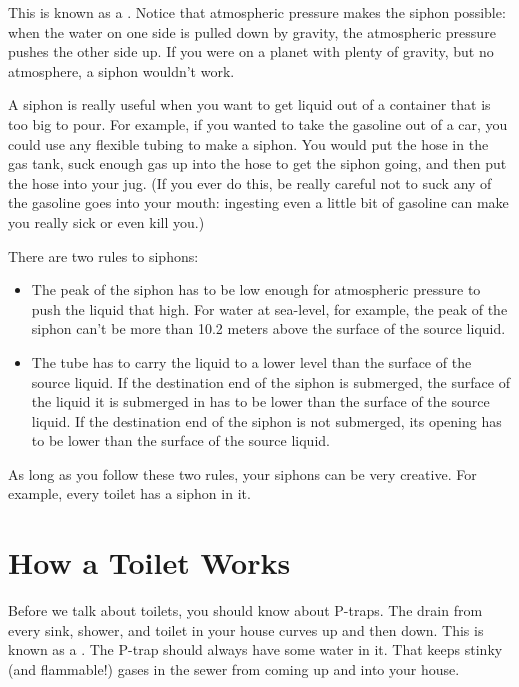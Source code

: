 This is known as a .   Notice that atmospheric pressure makes the siphon possible:  when the water on one side is pulled down by gravity,  the atmospheric pressure pushes the other side up.  If you were on a planet with plenty of gravity,  but no atmosphere,  a siphon wouldn't work.

A siphon is really useful when you want to get liquid out of a container that is too big to pour.   For 
example, if you wanted to take the gasoline out of a car,  you could use any flexible tubing to make a siphon.  You would put the hose in the gas tank,  suck enough gas up into the hose to get the siphon going,  and then put the hose into your jug.  (If you ever do this,  be really careful not to suck any of the gasoline goes into your mouth: ingesting even a little bit of gasoline can make you really sick or even kill you.)

There are two rules to siphons:
\begin{itemize}
\item The peak of the siphon has to be low enough for atmospheric pressure to push the liquid that high.  For water at sea-level, for example,  the peak of the siphon can't be more than 10.2 meters above the surface of the source liquid. 

\item  The tube has to carry the liquid to a lower level than the surface of the source liquid.   If the destination end of the siphon is submerged,  the surface of the liquid it is submerged in has to be lower than the surface of the source liquid.  If the destination end of the siphon is not submerged,  its opening has to be lower than the surface of the source liquid.
\end{itemize}

As long as you follow these two rules,  your siphons can be very creative.  For example,  every toilet has a siphon in it.

\section{How a Toilet Works}

Before we talk about toilets,  you should know about P-traps.  The drain from every sink, shower, 
and toilet in your house curves up and then down.  This is known as a .   
The P-trap should always have some water in it.  That keeps stinky (and flammable!) gases 
in the sewer from coming up and into your house.  

